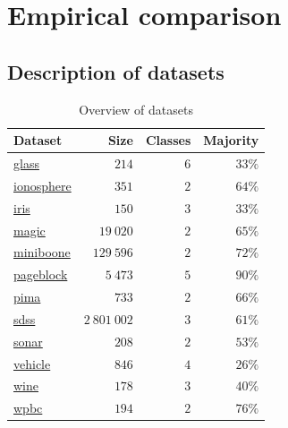 \documentclass[fleqn,10pt,lineno]{wlpeerj} %
\begin{document}
\section*{Empirical comparison}

\subsection*{Description of datasets}

\begin{table}[h]
	\caption {Overview of datasets} \label{tab:datasets}
	\centering
	\begin{tabular}{lrrr}
		\toprule
		{Dataset}  & Size &  Classes & Majority  \\
		\midrule
        \href{https://archive.ics.uci.edu/ml/datasets/Glass+Identification}{glass}
        	& $214$ & $6$ & $33\%$ \\
		\href{https://archive.ics.uci.edu/ml/datasets/Ionosphere}{ionosphere}
        	& $351$ & $2$ & $64\%$ \\
        \href{https://archive.ics.uci.edu/ml/datasets/Breast+Cancer+Wisconsin+(Prognostic)}{iris}
        	& $150$ & $3$ & $33\%$ \\
        \href{https://archive.ics.uci.edu/ml/datasets/MAGIC+Gamma+Telescope}{magic}
        	& $19~020$ & $2$ & $65\%$ \\
        \href{https://archive.ics.uci.edu/ml/datasets/MiniBooNE+particle+identification}{miniboone}
        	& $129~596$ & $2$ & $72\%$ \\
        \href{https://archive.ics.uci.edu/ml/datasets/Page+Blocks+Classification}{pageblock}
        	& $5~473$ & $5$ & $90\%$ \\
		\href{https://archive.ics.uci.edu/ml/datasets/Pima+Indians+Diabetes}{pima}
        	& $733$ & $2$ & $66\%$ \\
        \href{http://dx.doi.org/10.5281/zenodo.58500}{sdss}
        	& $2~801~002$ & $3$ & $61\%$ \\
		\href{https://archive.ics.uci.edu/ml/datasets/Connectionist+Bench+(Sonar,+Mines+vs.+Rocks)}{sonar}
        	& $208$ & $2$ & $53\%$ \\
        \href{https://archive.ics.uci.edu/ml/datasets/Statlog+(Vehicle+Silhouettes)}{vehicle}
        	& $846$ & $4$ & $26\%$ \\
        \href{https://archive.ics.uci.edu/ml/datasets/Wine}{wine}
        	& $178$ & $3$ & $40\%$ \\
		\href{https://archive.ics.uci.edu/ml/datasets/Breast+Cancer+Wisconsin+(Prognostic)}{wpbc}
        	& $194$ & $2$ & $76\%$ \\
		\bottomrule
	\end{tabular}
\end{table}
\end{document}
